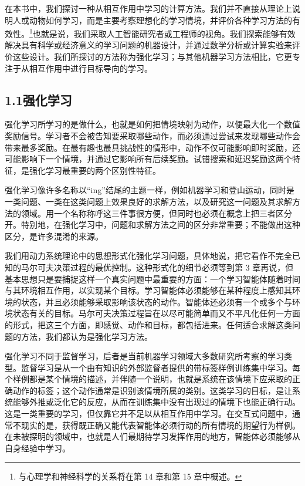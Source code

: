 \documentclass[UTF8, 12pt, fontset=fandol, oneside]{ctexart}
\begin{document}
在本书中，我们探讨一种从相互作用中学习的计算方法。我们并不直接从理论上说明人或动物如何学习，而是主要考察理想化的学习情境，并评价各种学习方法的有效性。\footnote{与心理学和神经科学的关系将在第 14 章和第 15 章中概述。}也就是说，我们采取人工智能研究者或工程师的视角。我们探索能够有效解决具有科学或经济意义的学习问题的机器设计，并通过数学分析或计算实验来评价这些设计。我们所探讨的方法称为强化学习；与其他机器学习方法相比，它更专注于从相互作用中进行目标导向的学习。

\subsection*{1.1\quad 强化学习}

强化学习所学习的是做什么，也就是如何把情境映射为动作，以便最大化一个数值奖励信号。学习者不会被告知要采取哪些动作，而必须通过尝试来发现哪些动作会带来最多奖励。在最有趣也最具挑战性的情形中，动作不仅可能影响即时奖励，还可能影响下一个情境，并通过它影响所有后续奖励。试错搜索和延迟奖励这两个特征，是强化学习最重要的两个区别性特征。

强化学习像许多名称以“ing”结尾的主题一样，例如机器学习和登山运动，同时是一类问题、一类在这类问题上效果良好的求解方法，以及研究这一问题及其求解方法的领域。用一个名称称呼这三件事很方便，但同时也必须在概念上把三者区分开。特别地，在强化学习中，问题和求解方法之间的区分非常重要；不能做出这种区分，是许多混淆的来源。

我们用动力系统理论中的思想形式化强化学习问题，具体地说，把它看作不完全已知的马尔可夫决策过程的最优控制。这种形式化的细节必须等到第 3 章再说，但基本思想只是要捕捉这样一个真实问题中最重要的方面：一个学习智能体随着时间与其环境相互作用，以实现某个目标。学习智能体必须能够在某种程度上感知其环境的状态，并且必须能够采取影响该状态的动作。智能体还必须有一个或多个与环境状态有关的目标。马尔可夫决策过程旨在以尽可能简单而又不平凡化任何一方面的形式，把这三个方面，即感觉、动作和目标，都包括进来。任何适合求解这类问题的方法，我们都认为是强化学习方法。

强化学习不同于监督学习，后者是当前机器学习领域大多数研究所考察的学习类型。监督学习是从一个由有知识的外部监督者提供的带标签样例训练集中学习。每个样例都是某个情境的描述，并伴随一个说明，也就是系统在该情境下应采取的正确动作的标签；这个动作通常是识别该情境所属的类别。这类学习的目标，是让系统能够外推或泛化它的反应，从而在训练集中没有出现过的情境下也能正确行动。这是一类重要的学习，但仅靠它并不足以从相互作用中学习。在交互式问题中，通常不现实的是，获得既正确又能代表智能体必须行动的所有情境的期望行为样例。在未被探明的领域中，也就是人们最期待学习发挥作用的地方，智能体必须能够从自身经验中学习。
\end{document}

